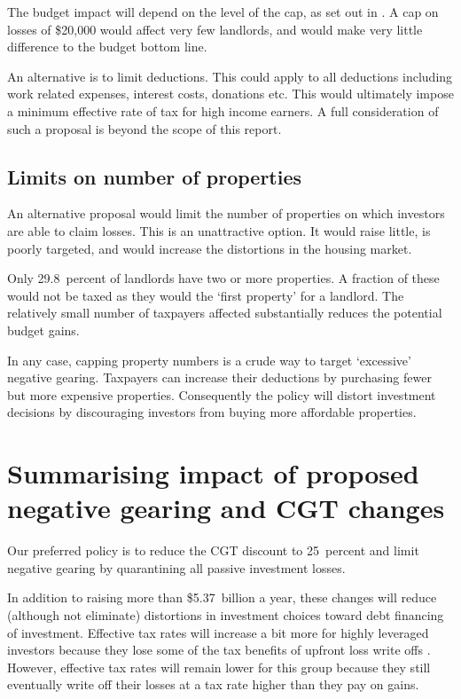 \documentclass{grattan}\usepackage[]{graphicx}\usepackage[]{color}
\begin{document}
The budget impact will depend on the level of the cap, as set out in . A cap on losses of \$20,000  would affect very few landlords, and would make very little difference to the budget bottom line.

An alternative is to limit deductions. This could apply to all deductions including work related expenses, interest costs, donations etc. This would ultimately impose a minimum effective rate of tax for high income earners.   A full consideration of such a proposal is beyond the scope of this report. 

\subsection{Limits on number of properties}
An alternative proposal would limit the number of properties on which investors are able to claim losses.  This is an unattractive option. It would raise little, is poorly targeted, and would increase the distortions in the housing market.



Only 29.8~percent of landlords have two or more properties.  A fraction of these would not be taxed as they would the `first property' for a landlord. The relatively small number of taxpayers affected substantially reduces the potential budget gains. 

In any case, capping property numbers is a crude way to target `excessive' negative gearing. Taxpayers can increase their deductions by purchasing fewer but more expensive properties. Consequently the policy will distort investment decisions by discouraging investors from buying more affordable properties. 

\section{Summarising impact of proposed negative gearing and CGT changes}
Our preferred policy is to reduce the CGT discount to 25~percent and limit negative gearing by quarantining all passive investment losses. 

In addition to raising more than \$5.37~billion a year, these changes will reduce (although not eliminate) distortions in investment choices toward debt financing of investment. Effective tax rates will increase a bit more for highly leveraged investors because they lose some of the tax benefits of upfront loss write offs . However, effective tax rates will remain lower for this group because they still eventually write off their losses at a tax rate higher than they pay on gains. 
\end{document}
